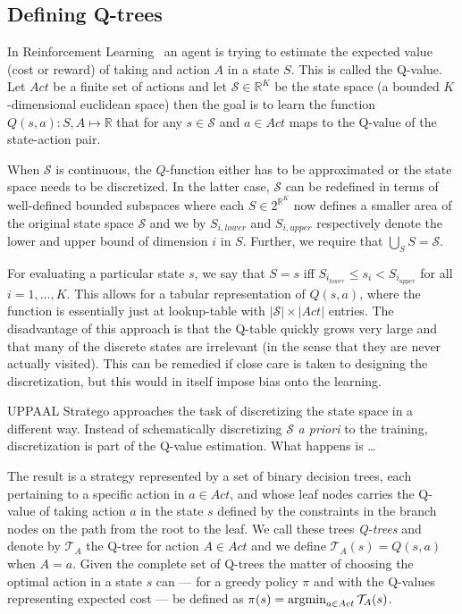 \subsection{Defining Q-trees}%
\label{subsec:defQTrees}

In Reinforcement Learning~\cite{Sutton1998} an agent is trying to estimate the
expected value (cost or reward) of taking and action $A$ in a state $S$. This is
called the Q-value. Let $Act$ be a finite set of actions and let $\mathcal{S}
\in \mathbb{R}^K$ be the state space (a bounded $K$-dimensional euclidean space)
then the goal is to learn the function $Q(s,a) : S, A \mapsto \mathbb{R}$ that
for any $s \in \mathcal{S}$ and $a \in Act$ maps to the Q-value of the
state-action pair.

When $\mathcal{S}$ is continuous, the $Q$-function either has to be approximated
or the state space needs to be discretized. In the latter case, $\mathcal{S}$
can be redefined in terms of well-defined bounded subspaces where each $S \in
2^{\mathbb{R}^{K}}$ now defines a smaller area of the original state space
$\mathcal{S}$ and we by $S_{i,lower}$ and $S_{i,upper}$ respectively denote the lower and
upper bound of dimension $i$ in $S$. Further, we require that $\bigcup_S S =
\mathcal{S}$.

For evaluating a particular state $s$, we say that $S = s$ iff $S_{i_{lower}}
\le s_i < S_{i_{upper}}$ for all $i = 1, \ldots, K$.  This allows for a tabular
representation of $Q(s,a)$, where the function is essentially just at
lookup-table with $|\mathcal{S}| \times |Act|$ entries. The disadvantage
of this approach is that the Q-table quickly grows very large and that many of
the discrete states are irrelevant (in the sense that they are never actually
visited). This can be remedied if close care is taken to designing the
discretization, but this would in itself impose bias onto the learning.

UPPAAL Stratego approaches the task of discretizing the state space in a
different way. Instead of schematically discretizing $\mathcal{S}$ \textit{a
priori} to the training, discretization is part of the Q-value estimation. What
happens is \ldots{}

The result is a strategy represented by a set of binary decision trees, each
pertaining to a specific action in $a \in Act$, and whose leaf nodes carries the
Q-value of taking action $a$ in the state $s$ defined by the constraints in the
branch nodes on the path from the root to the leaf. We call these trees
\textit{Q-trees} and denote by $\mathcal{T}_A$ the Q-tree for action $A \in Act$
and we define $\mathcal{T}_A(s) = Q(s,a)$ when $A=a$. Given the complete set of Q-trees
the matter of choosing the optimal action in a state $s$ can --- for a greedy
policy $\pi$ and with the Q-values representing expected cost --- be defined as
$\pi(s) = \operatorname*{argmin}_{a\in Act} \mathcal{T}_A(s)$.


